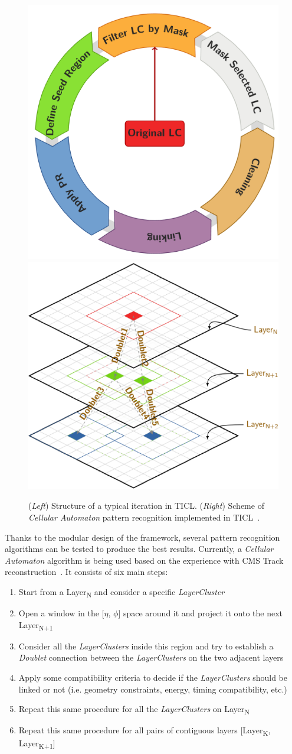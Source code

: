 \begin{figure}[tbp]
    \centering %
    \includegraphics[width=.4\textwidth]{chapters/HGCal/figures/chef/iter}
    \qquad
    \includegraphics[width=.4\textwidth]{chapters/HGCal/figures/chef/pralgo}
    \caption{\label{fig:iter} (\emph{Left}) Structure of a typical iteration in TICL. (\emph{Right}) Scheme of \emph{Cellular Automaton} pattern recognition implemented in TICL~\cite{9}.}
\end{figure}

Thanks to the modular design of the framework, several pattern recognition algorithms can be tested to produce the best results. Currently, a \emph{Cellular Automaton} algorithm is being used based on the experience with CMS Track reconstruction~\cite{10}. It consists of six main steps:

\begin{enumerate}
\itemsep0em
    \item Start from a Layer\textsubscript{N} and consider a specific \emph{LayerCluster}
    \item Open a window in the [$\eta$, $\phi$] space around it and project it onto the next Layer\textsubscript{N+1}
    \item Consider all the \emph{LayerClusters} inside this region and try to establish a \emph{Doublet} connection between the \emph{LayerClusters} on the two adjacent layers
    \item Apply some compatibility criteria to decide if the \emph{LayerClusters} should be linked or not (i.e. geometry constraints, energy, timing compatibility, etc.)
    \item Repeat this same procedure for all the \emph{LayerClusters} on Layer\textsubscript{N}
    \item Repeat this same procedure for all pairs of contiguous layers [Layer\textsubscript{K}, Layer\textsubscript{K+1}]
\end{enumerate}

